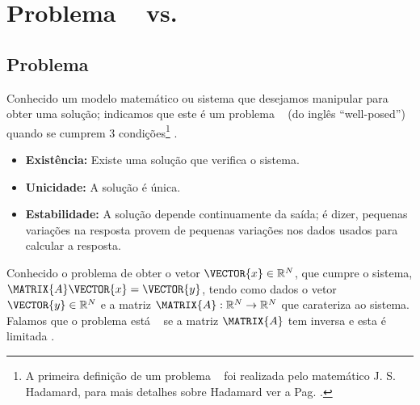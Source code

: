 \section{Problema \wellposed~ vs. \illposed }

\subsection{Problema \wellposed}
\begin{definition}
\label{def:bem-posto:1}
Conhecido um modelo matemático ou sistema que desejamos manipular para obter uma solução;
indicamos que este é um problema \wellposed~ (do inglês ``well-posed'') 
quando se cumprem 3 condições\footnote{A primeira definição de um problema \wellposed~ foi realizada pelo matemático J. S. Hadamard, 
para mais detalhes sobre Hadamard ver a Pag. \pageref{elab:Hadamard}.} \cite[pp. 16]{gockenbach2016linear}
\cite[pp. 6]{p2011well}.
\begin{itemize}
\item \textbf{Existência:} Existe uma solução que verifica o sistema.
\item \textbf{Unicidade:} A solução é única.
\item \textbf{Estabilidade:} A solução depende continuamente da saída;
é dizer, pequenas variações na resposta provem de pequenas variações nos dados usados para calcular a resposta.
\end{itemize}
\end{definition}

\begin{example}
Conhecido o problema de obter o vetor $\VECTOR{x} \in \mathbb{R}^{N}$,
que cumpre o sistema, $\MATRIX{A}\VECTOR{x}=\VECTOR{y}$,
 tendo como dados o vetor $\VECTOR{y} \in \mathbb{R}^{N}$ e 
a matriz $\MATRIX{A}: \mathbb{R}^{N} \rightarrow \mathbb{R}^{N}$ que carateriza ao sistema.
Falamos que o problema está \wellposed~ se a matriz $\MATRIX{A}$ tem inversa e esta é limitada \cite[pp. 18]{gockenbach2016linear}. 
\end{example}

